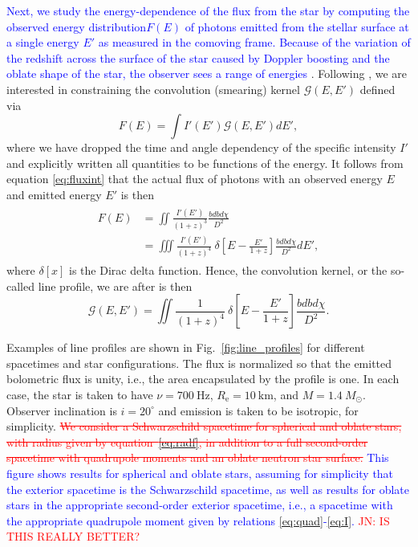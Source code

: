 \documentclass{aa}
\newcommand{\be}{\begin{equation}}
\newcommand{\ee}{\end{equation}}
\newcommand{\red}[1]{\textcolor{red}{#1}}
\newcommand{\refe}[1]{\textcolor{blue}{{#1}}}
\newcommand{\refedel}[1]{\textcolor{red}{\sout{#1}}}
\newcommand{\sch}{Schwarzschild }
\newcommand{\Msun}{\ensuremath{M_{\odot}}}
\begin{document}
\refe{Next, we study the energy-dependence of the flux from the star by computing the observed energy distribution$ F(E)$ of photons emitted from the stellar surface at a single energy $E'$ as measured in the comoving frame. 
Because of the variation of the redshift across the surface of the star caused by Doppler boosting and the oblate shape of the star, the observer sees a range of energies} \citep{OP03,BML06,CMB06}.
Following \citealt{Baubock15}, we are interested in constraining the convolution (smearing) kernel $\mathcal{G}(E,E')$ defined via
\be
F(E) = \int I'(E') \mathcal{G}(E,E') dE',
\ee
where we have dropped the time and angle dependency of the specific intensity $I'$ and explicitly written all quantities to be functions of the energy.
It follows from equation \eqref{eq:fluxint} that the actual flux of photons with an observed energy $E$ and emitted energy $E'$ is then
\begin{align}\begin{split}
    F(E) &= \iint \frac{ I'(E') }{ (1+z)^3 } \frac{bdb d\chi}{D^2} \\
         &= \iiint \frac{I'(E') }{(1+z)^4} ~ \delta \left[ E - \frac{E'}{1+z} \right]  \frac{bdb d\chi}{D^2} dE',
\end{split}\end{align}
where $\delta[x]$ is the Dirac delta function.
Hence, the convolution kernel, or the so-called line profile, we are after is then 
\be
\mathcal{G}(E,E') =  \iint \frac{1}{(1+z)^4} ~\delta \left[E - \frac{E'}{1+z} \right]  \frac{bdb d\chi}{D^2}.
\ee


Examples of line profiles are shown in Fig.~\ref{fig:line_profiles} for different spacetimes and star configurations.
The flux is normalized so that the emitted bolometric flux is unity, i.e., the area encapsulated by the profile is one.
In each case, the star is taken to have $\nu = 700~\mathrm{Hz}$, $R_{\mathrm{e}} = 10~\mathrm{km}$, and $M=1.4~\Msun$.
Observer inclination is $i=20^{\circ}$ and emission is taken to be isotropic, for simplicity.
\refedel{We consider a \sch spacetime for spherical and oblate stars, with radius given by equation~\eqref{eq:radf}, in addition to a full second-order spacetime with quadrupole moments and an oblate neutron star surface.}
\refe{
This figure shows results for spherical and oblate stars, assuming for simplicity that the exterior spacetime is the Schwarzschild spacetime, as well as results for oblate stars in the appropriate second-order exterior spacetime, 
i.e., a spacetime with the appropriate quadrupole moment given by relations \eqref{eq:quad}-\eqref{eq:I}.
}
\red{JN: IS THIS REALLY BETTER?}
\end{document}
